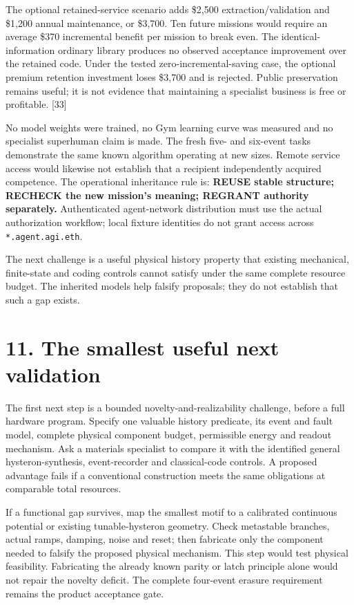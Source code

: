\documentclass[
  11pt,
]{article}
\begin{document}
The optional retained-service scenario adds \$2,500
extraction/validation and \$1,200 annual maintenance, or \$3,700. Ten
future missions would require an average \$370 incremental benefit per
mission to break even. The identical-information ordinary library
produces no observed acceptance improvement over the retained code.
Under the tested zero-incremental-saving case, the optional premium
retention investment loses \$3,700 and is rejected. Public preservation
remains useful; it is not evidence that maintaining a specialist
business is free or profitable. {[}33{]}

No model weights were trained, no Gym learning curve was measured and no
specialist superhuman claim is made. The fresh five- and six-event tasks
demonstrate the same known algorithm operating at new sizes. Remote
service access would likewise not establish that a recipient
independently acquired competence. The operational inheritance rule is:
\textbf{REUSE stable structure; RECHECK the new mission's meaning;
REGRANT authority separately.} Authenticated agent-network distribution
must use the actual authorization workflow; local fixture identities do
not grant access across \texttt{*.agent.agi.eth}.

The next challenge is a useful physical history property that existing
mechanical, finite-state and coding controls cannot satisfy under the
same complete resource budget. The inherited models help falsify
proposals; they do not establish that such a gap exists.

\hypertarget{the-smallest-useful-next-validation}{%
\section{11. The smallest useful next
validation}\label{the-smallest-useful-next-validation}}

The first next step is a bounded novelty-and-realizability challenge,
before a full hardware program. Specify one valuable history predicate,
its event and fault model, complete physical component budget,
permissible energy and readout mechanism. Ask a materials specialist to
compare it with the identified general hysteron-synthesis,
event-recorder and classical-code controls. A proposed advantage fails
if a conventional construction meets the same obligations at comparable
total resources.

If a functional gap survives, map the smallest motif to a calibrated
continuous potential or existing tunable-hysteron geometry. Check
metastable branches, actual ramps, damping, noise and reset; then
fabricate only the component needed to falsify the proposed physical
mechanism. This step would test physical feasibility. Fabricating the
already known parity or latch principle alone would not repair the
novelty deficit. The complete four-event erasure requirement remains the
product acceptance gate.
\end{document}
